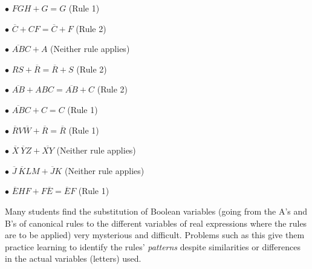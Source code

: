 \medskip
\item{$\bullet$} $FGH + G = G$ (Rule 1)
\vskip 5pt
\item{$\bullet$} $\overline{C} + CF = \overline{C} + F$ (Rule 2)
\vskip 5pt
\item{$\bullet$} $\overline{AB}C + A$ \hskip 10pt (Neither rule applies)
\vskip 5pt
\item{$\bullet$} $RS + \overline{R} = \overline{R} + S$ (Rule 2)
\vskip 5pt
\item{$\bullet$} $\overline{AB} + ABC = \overline{AB} + C$ (Rule 2)
\vskip 5pt
\item{$\bullet$} $\overline{AB}C + C = C$ (Rule 1)
\vskip 5pt
\item{$\bullet$} $\overline{R}V\overline{W} + \overline{R} = \overline{R}$ (Rule 1)
\vskip 5pt
\item{$\bullet$} $\overline{X} \> \overline{Y} Z + \overline{XY}$ \hskip 10pt (Neither rule applies)
\vskip 5pt
\item{$\bullet$} $\overline{J} \> \overline{K} L M + \overline{J}K$ \hskip 10pt (Neither rule applies)
\vskip 5pt
\item{$\bullet$} $\overline{E}HF + F\overline{E} = \overline{E}F$ (Rule 1)
\medskip







Many students find the substitution of Boolean variables (going from the A's and B's of canonical rules to the different variables of real expressions where the rules are to be applied) very mysterious and difficult.  Problems such as this give them practice learning to identify the rules' {\it patterns} despite similarities or differences in the actual variables (letters) used.




